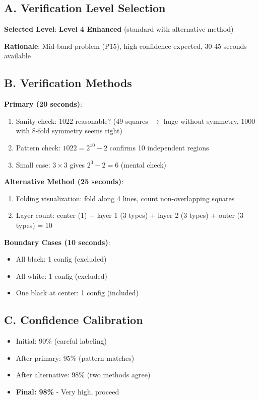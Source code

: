 \documentclass[]{article}
\begin{document}
\begin{verificationbox}
\subsection*{A. Verification Level Selection}

\textbf{Selected Level}: \textbf{Level 4 Enhanced} (standard with alternative method)

\textbf{Rationale}: Mid-band problem (P15), high confidence expected, 30-45 seconds available

\subsection*{B. Verification Methods}

\textbf{Primary (20 seconds)}:
\begin{enumerate}[nosep]
    \item Sanity check: 1022 reasonable? (49 squares $\rightarrow$ huge without symmetry, 1000 with 8-fold symmetry seems right)
    \item Pattern check: $1022 = 2^{10} - 2$ confirms 10 independent regions
    \item Small case: $3 \times 3$ gives $2^3 - 2 = 6$ (mental check)
\end{enumerate}

\textbf{Alternative Method (25 seconds)}:
\begin{enumerate}[nosep]
    \item Folding visualization: fold along 4 lines, count non-overlapping squares
    \item Layer count: center (1) + layer 1 (3 types) + layer 2 (3 types) + outer (3 types) = 10
\end{enumerate}

\textbf{Boundary Cases (10 seconds)}:
\begin{itemize}[nosep]
    \item All black: 1 config (excluded)
    \item All white: 1 config (excluded)
    \item One black at center: 1 config (included)
\end{itemize}

\subsection*{C. Confidence Calibration}

\begin{itemize}[leftmargin=*]
    \item Initial: 90\% (careful labeling)
    \item After primary: 95\% (pattern matches)
    \item After alternative: 98\% (two methods agree)
    \item \textbf{Final: 98\%} - Very high, proceed
\end{itemize}
\end{verificationbox}
\end{document}
